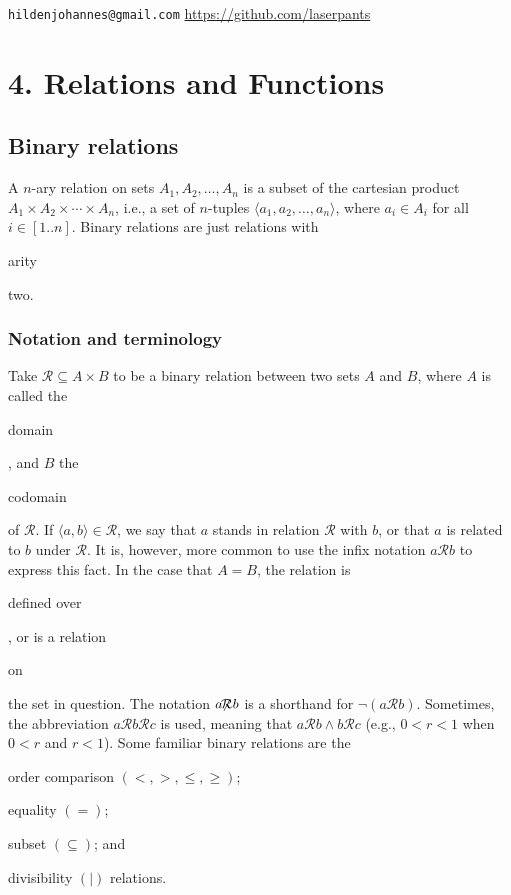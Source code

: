 \documentclass[11pt]{article}
\theoremstyle{plain}
\theoremstyle{definition}
\newenvironment{packed_items}{
\begin{itemize}
  \setlength{\itemsep}{1pt}
  \setlength{\parskip}{0pt}
  \setlength{\parsep}{0pt}
}{\end{itemize}}
\begin{document}
\noindent \verb|hildenjohannes@gmail.com| \hfill \url{https://github.com/laserpants} 

\section*{4. Relations and Functions}

\subsection*{Binary relations}

A $ n $-ary relation on sets $ A_1, A_2, \dots, A_n $ is a subset of the cartesian product $ A_1 \times A_2 \times \cdots \times A_n $, i.e., a set of $ n $-tuples $ \langle a_1, a_2, \dots, a_n \rangle $, where $ a_i \in A_i $ for all $ i \in [1 .. n]$. Binary relations are just relations with \begin{em}arity\end{em} two.  

\subsubsection*{Notation and terminology}

\noindent Take $ \mathcal{R} \subseteq A \times B $ to be a binary relation between two sets $ A $ and $ B $, where $ A $ is called the \begin{em}domain\end{em}, and $ B $ the \begin{em}codomain\end{em} of $ \mathcal{R} $. If $ \langle a, b \rangle \in \mathcal{R} $, we say that $ a $ stands in relation $ \mathcal{R} $ with $ b $, or that $ a $ is related to $ b $ under $ \mathcal{R} $. It is, however, more common to use the infix notation $ a \mathcal{R} b $ to express this fact. In the case that $ A = B $, the relation is \begin{em}defined over\end{em}, or is a relation \begin{em}on\end{em} the set in question. 
The notation $ a \!\!\not\!\!\mathcal{R} b $ is a shorthand for $ \neg (a \mathcal{R} b) $.
Sometimes, the abbreviation $ a \mathcal{R} b \mathcal{R} c $ is used, meaning that $ a \mathcal{R} b \wedge b \mathcal{R} c $ (e.g., $ 0 < r < 1 $ when $ 0 < r $ and $ r < 1 $). 
Some familiar binary relations are the

\begin{packed_items}
	\item order comparison $(<, >, \le, \ge)$;
	\item equality $(=)$; 
	\item subset $(\subseteq)$; and 
	\item divisibility $(|)$ relations. 
\end{packed_items}
 
\end{document}

